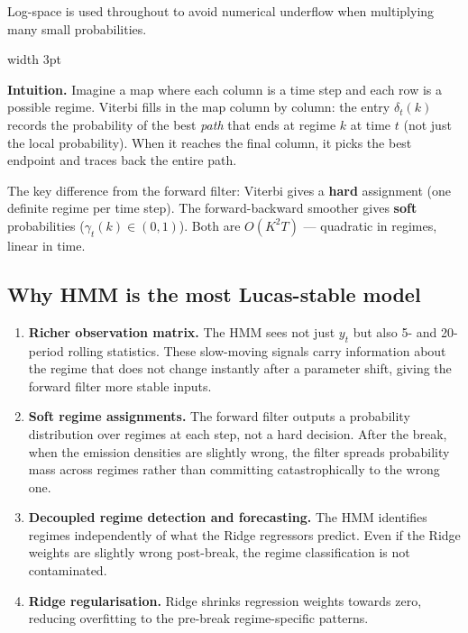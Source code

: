 \documentclass[11pt, a4paper]{article}
\newenvironment{intubox}{%
  \vspace{4pt}\par\noindent%
  {\color{darkblue}\vrule width 3pt}\hspace{6pt}%
  \begin{minipage}{\dimexpr\linewidth-9pt\relax}\vspace{2pt}%
}{%
  \vspace{2pt}\end{minipage}\par\vspace{4pt}%
}
\begin{document}
Log-space is used throughout to avoid numerical underflow when multiplying
many small probabilities.

\begin{intubox}
\textbf{Intuition.}
Imagine a map where each column is a time step and each row is a possible
regime. Viterbi fills in the map column by column: the entry $\delta_t(k)$
records the probability of the best \emph{path} that ends at regime $k$ at
time $t$ (not just the local probability). When it reaches the final column,
it picks the best endpoint and traces back the entire path.

The key difference from the forward filter: Viterbi gives a \textbf{hard}
assignment (one definite regime per time step). The forward-backward smoother
gives \textbf{soft} probabilities ($\gamma_t(k)\in(0,1)$). Both are
$O(K^2 T)$ --- quadratic in regimes, linear in time.
\end{intubox}

\subsection{Why HMM is the most Lucas-stable model}

\begin{enumerate}[leftmargin=*, itemsep=3pt]
  \item \textbf{Richer observation matrix.} The HMM sees not just $y_t$ but
        also 5- and 20-period rolling statistics. These slow-moving signals
        carry information about the regime that does not change instantly after
        a parameter shift, giving the forward filter more stable inputs.
  \item \textbf{Soft regime assignments.} The forward filter outputs a
        probability distribution over regimes at each step, not a hard decision.
        After the break, when the emission densities are slightly wrong, the
        filter spreads probability mass across regimes rather than committing
        catastrophically to the wrong one.
  \item \textbf{Decoupled regime detection and forecasting.} The HMM identifies
        regimes independently of what the Ridge regressors predict. Even if the
        Ridge weights are slightly wrong post-break, the regime classification is
        not contaminated.
  \item \textbf{Ridge regularisation.} Ridge shrinks regression weights towards
        zero, reducing overfitting to the pre-break regime-specific patterns.
\end{enumerate}
\end{document}
